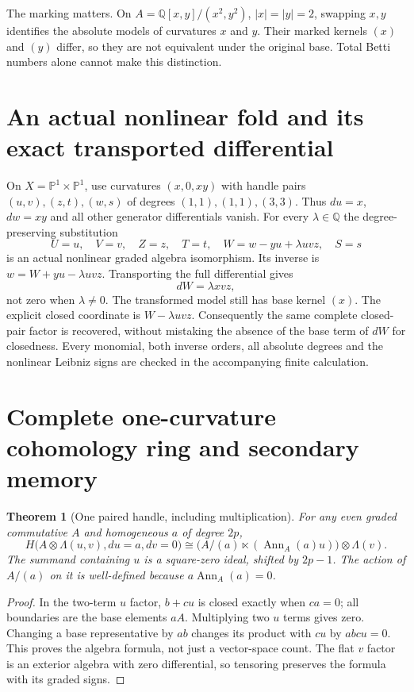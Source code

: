 \documentclass[11pt]{article}
\newtheorem{theorem}{Theorem}
\newcommand{\Q}{\mathbb Q}
\newcommand{\Ann}{\operatorname{Ann}}
\begin{document}
The marking matters. On $A=\Q[x,y]/(x^2,y^2)$, $|x|=|y|=2$, swapping
$x,y$ identifies the absolute models of curvatures $x$ and $y$. Their
marked kernels $(x)$ and $(y)$ differ, so they are not equivalent under
the original base. Total Betti numbers alone cannot make this distinction.

\section{An actual nonlinear fold and its exact transported differential}
On $X=\mathbb P^1\times\mathbb P^1$, use curvatures $(x,0,xy)$ with
handle pairs $(u,v),(z,t),(w,s)$ of degrees $(1,1),(1,1),(3,3)$.
Thus $du=x$, $dw=xy$ and all other generator differentials vanish. For
every $\lambda\in\Q$ the degree-preserving substitution
\[
 U=u,\quad V=v,\quad Z=z,\quad T=t,\quad
 W=w-yu+\lambda uvz,\quad S=s
\]
is an actual nonlinear graded algebra isomorphism. Its inverse is
$w=W+yu-\lambda uvz$. Transporting the full differential gives
\[
 dW=\lambda xvz,
\]
not zero when $\lambda\ne0$. The transformed model still has base
kernel $(x)$. The explicit closed coordinate is $W-\lambda uvz$.
Consequently the same complete closed-pair factor is recovered, without
mistaking the absence of the base term of $dW$ for closedness. Every
monomial, both inverse orders, all absolute degrees and the nonlinear
Leibniz signs are checked in the accompanying finite calculation.

\section{Complete one-curvature cohomology ring and secondary memory}
\begin{theorem}[One paired handle, including multiplication]
For any even graded commutative $A$ and homogeneous $a$ of degree $2p$,
\[
 H\bigl(A\otimes\Lambda(u,v),du=a,dv=0\bigr)
 \cong \bigl(A/(a)\ltimes (\Ann_A(a)u)\bigr)\otimes\Lambda(v).
\]
The summand containing $u$ is a square-zero ideal, shifted by $2p-1$.
The action of $A/(a)$ on it is well-defined because $a\Ann_A(a)=0$.
\end{theorem}
\begin{proof}
In the two-term $u$ factor, $b+cu$ is closed exactly when $ca=0$;
all boundaries are the base elements $aA$. Multiplying two $u$ terms
gives zero. Changing a base representative by $ab$ changes its product
with $cu$ by $abc u=0$. This proves the algebra formula, not just a
vector-space count. The flat $v$ factor is an exterior algebra with zero
differential, so tensoring preserves the formula with its graded signs.
\end{proof}
\end{document}
